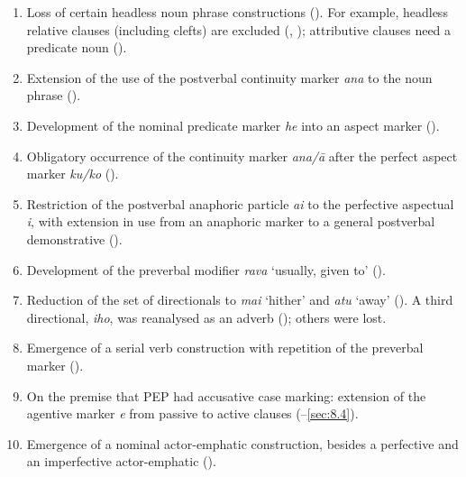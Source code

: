 \begin{enumerate}
\item 
Loss of certain headless noun phrase constructions (). For example, headless relative clauses (including clefts) are excluded (, ); attributive clauses need a predicate noun (). 

\item 
Extension of the use of the postverbal continuity marker \textit{{\ꞌ}ana} to the noun phrase ().

\item 
Development of the nominal predicate marker \textit{he} into an aspect marker ().

\item 
Obligatory occurrence of the continuity marker \textit{{\ꞌ}ana/{\ꞌ}ā} after the perfect aspect marker \textit{ku/ko} ().

\item 
Restriction of the postverbal anaphoric particle \textit{ai} to the perfective aspectual \textit{i}, with extension in use from an anaphoric marker to a general postverbal demonstrative ().

\item 
Development of the preverbal modifier \textit{rava} ‘usually, given to’ ().

\item 
Reduction of the set of directionals to \textit{mai} ‘hither’ and \textit{atu} ‘away’ (). A third directional, \textit{iho}, was reanalysed as an adverb (); others were lost.

\item 
Emergence of a serial verb construction with repetition of the preverbal marker ().

\item 
On the premise that PEP had accusative case marking: extension of the agentive marker \textit{e} from passive to active clauses (–\ref{sec:8.4}).

\item 
Emergence of a nominal actor-emphatic construction, besides a perfective and an imperfective actor-emphatic ().


\end{enumerate}
